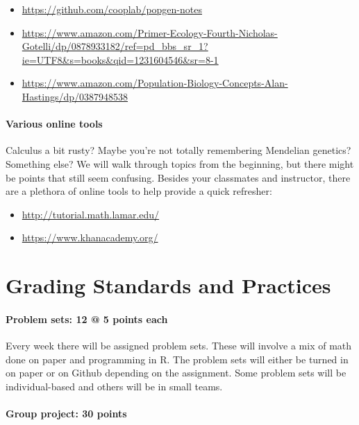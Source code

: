 \documentclass[12pt,]{article}
\providecommand{\tightlist}{%
  \setlength{\itemsep}{0pt}\setlength{\parskip}{0pt}}
\let\oldparagraph\paragraph
\renewcommand{\paragraph}[1]{\oldparagraph{#1}\mbox{}}
\begin{document}
\begin{itemize}
\tightlist
\item
  \url{https://github.com/cooplab/popgen-notes}
\item
  \url{https://www.amazon.com/Primer-Ecology-Fourth-Nicholas-Gotelli/dp/0878933182/ref=pd_bbs_sr_1?ie=UTF8\&s=books\&qid=1231604546\&sr=8-1}
\item
  \url{https://www.amazon.com/Population-Biology-Concepts-Alan-Hastings/dp/0387948538}
\end{itemize}

\paragraph{Various online tools}\label{various-online-tools}

Calculus a bit rusty? Maybe you're not totally remembering Mendelian
genetics? Something else? We will walk through topics from the
beginning, but there might be points that still seem confusing. Besides
your classmates and instructor, there are a plethora of online tools to
help provide a quick refresher:

\begin{itemize}
\tightlist
\item
  \url{http://tutorial.math.lamar.edu/}
\item
  \url{https://www.khanacademy.org/}
\end{itemize}

\section{Grading Standards and
Practices}\label{grading-standards-and-practices}

\paragraph{Problem sets: 12 @ 5 points
each}\label{problem-sets-12-5-points-each}

Every week there will be assigned problem sets. These will involve a mix
of math done on paper and programming in R. The problem sets will either
be turned in on paper or on Github depending on the assignment. Some
problem sets will be individual-based and others will be in small teams.

\paragraph{Group project: 30 points}\label{group-project-30-points}
\end{document}
